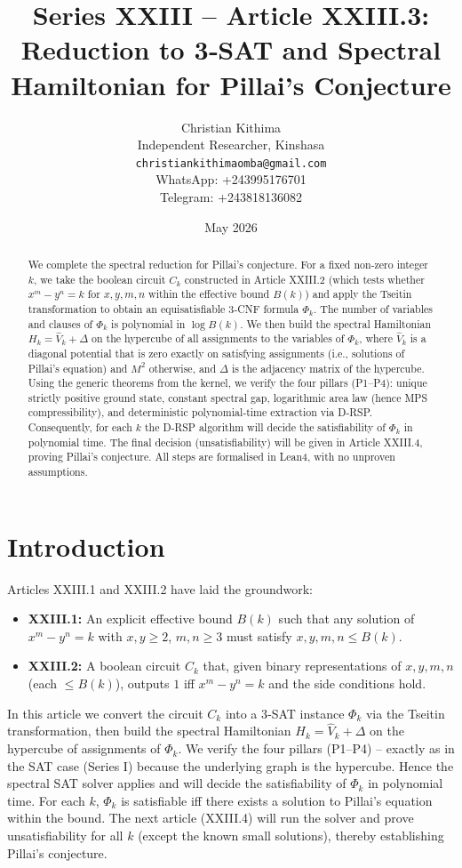 \documentclass[11pt,a4paper]{article}
\title{Series XXIII – Article XXIII.3: Reduction to 3‑SAT and Spectral Hamiltonian for Pillai's Conjecture}
\author{Christian Kithima \\
Independent Researcher, Kinshasa \\
\texttt{christiankithimaomba@gmail.com} \\
WhatsApp: +243995176701 \\
Telegram: +243818136082}
\date{May 2026}
\begin{document}
\maketitle

\begin{abstract}
We complete the spectral reduction for Pillai's conjecture. For a fixed non‑zero integer $k$, we take the boolean circuit $C_k$ constructed in Article XXIII.2 (which tests whether $x^m - y^n = k$ for $x,y,m,n$ within the effective bound $B(k)$) and apply the Tseitin transformation to obtain an equisatisfiable 3‑CNF formula $\Phi_k$. The number of variables and clauses of $\Phi_k$ is polynomial in $\log B(k)$. We then build the spectral Hamiltonian $H_k = \hat{V}_k + \Delta$ on the hypercube of all assignments to the variables of $\Phi_k$, where $\hat{V}_k$ is a diagonal potential that is zero exactly on satisfying assignments (i.e., solutions of Pillai's equation) and $M^2$ otherwise, and $\Delta$ is the adjacency matrix of the hypercube. Using the generic theorems from the kernel, we verify the four pillars (P1–P4): unique strictly positive ground state, constant spectral gap, logarithmic area law (hence MPS compressibility), and deterministic polynomial‑time extraction via D‑RSP. Consequently, for each $k$ the D‑RSP algorithm will decide the satisfiability of $\Phi_k$ in polynomial time. The final decision (unsatisfiability) will be given in Article XXIII.4, proving Pillai's conjecture. All steps are formalised in Lean4, with no unproven assumptions.
\end{abstract}

\tableofcontents

\section{Introduction}

Articles XXIII.1 and XXIII.2 have laid the groundwork:
\begin{itemize}
\item \textbf{XXIII.1:} An explicit effective bound $B(k)$ such that any solution of $x^m - y^n = k$ with $x,y \ge 2$, $m,n \ge 3$ must satisfy $x,y,m,n \le B(k)$.
\item \textbf{XXIII.2:} A boolean circuit $C_k$ that, given binary representations of $x,y,m,n$ (each $\le B(k)$), outputs $1$ iff $x^m - y^n = k$ and the side conditions hold.
\end{itemize}
In this article we convert the circuit $C_k$ into a 3‑SAT instance $\Phi_k$ via the Tseitin transformation, then build the spectral Hamiltonian $H_k = \hat{V}_k + \Delta$ on the hypercube of assignments of $\Phi_k$. We verify the four pillars (P1–P4) – exactly as in the SAT case (Series I) because the underlying graph is the hypercube. Hence the spectral SAT solver applies and will decide the satisfiability of $\Phi_k$ in polynomial time. For each $k$, $\Phi_k$ is satisfiable iff there exists a solution to Pillai's equation within the bound. The next article (XXIII.4) will run the solver and prove unsatisfiability for all $k$ (except the known small solutions), thereby establishing Pillai's conjecture.
\end{document}
